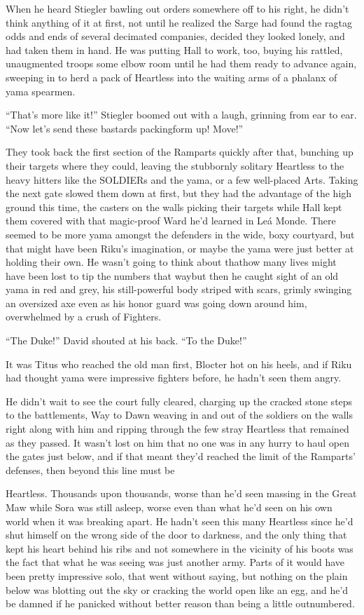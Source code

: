 When he heard Stiegler bawling out orders somewhere off to his right, he didn't think anything of it at first, not until he realized the Sarge had found the ragtag odds and ends of several decimated companies, decided they looked lonely, and had taken them in hand. He was putting Hall to work, too, buying his rattled, unaugmented troops some elbow room until he had them ready to advance again, sweeping in to herd a pack of Heartless into the waiting arms of a phalanx of yama spearmen.

``That's more like it!'' Stiegler boomed out with a laugh, grinning from ear to ear. ``Now let's send these bastards packing\textemdash form up! Move!''

They took back the first section of the Ramparts quickly after that, bunching up their targets where they could, leaving the stubbornly solitary Heartless to the heavy hitters like the SOLDIERs and the yama, or a few well-placed Arts. Taking the next gate slowed them down at first, but they had the advantage of the high ground this time, the casters on the walls picking their targets while Hall kept them covered with that magic-proof Ward he'd learned in Leá Monde. There seemed to be more yama amongst the defenders in the wide, boxy courtyard, but that might have been Riku's imagination, or maybe the yama were just better at holding their own. He wasn't going to think about that\textemdash how many lives might have been lost to tip the numbers that way\textemdash but then he caught sight of an old yama in red and grey, his still-powerful body striped with scars, grimly swinging an oversized axe even as his honor guard was going down around him, overwhelmed by a crush of Fighters.

``The Duke!'' David shouted at his back. ``To the Duke!''

It was Titus who reached the old man first, Blocter hot on his heels, and if Riku had thought yama were impressive fighters before, he hadn't seen them angry.

He didn't wait to see the court fully cleared, charging up the cracked stone steps to the battlements, Way to Dawn weaving in and out of the soldiers on the walls right along with him and ripping through the few stray Heartless that remained as they passed. It wasn't lost on him that no one was in any hurry to haul open the gates just below, and if that meant they'd reached the limit of the Ramparts' defenses, then beyond this line must be\textemdash 

Heartless. Thousands upon thousands, worse than he'd seen massing in the Great Maw while Sora was still asleep, worse even than what he'd seen on his own world when it was breaking apart. He hadn't seen this many Heartless since he'd shut himself on the wrong side of the door to darkness, and the only thing that kept his heart behind his ribs and not somewhere in the vicinity of his boots was the fact that what he was seeing was just another army. Parts of it would have been pretty impressive solo, that went without saying, but nothing on the plain below was blotting out the sky or cracking the world open like an egg, and he'd be damned if he panicked without better reason than being a little outnumbered.

